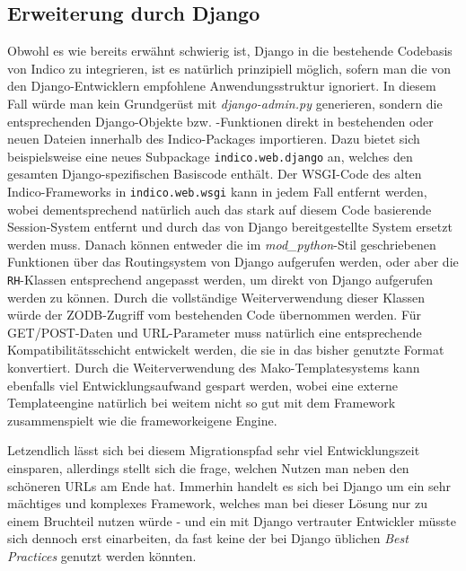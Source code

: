 \subsection{Erweiterung durch Django}
Obwohl es wie bereits erwähnt schwierig ist, Django in die bestehende Codebasis von Indico zu
integrieren, ist es natürlich prinzipiell möglich, sofern man die von den Django-Entwicklern
empfohlene Anwendungsstruktur ignoriert. In diesem Fall würde man kein Grundgerüst mit
\emph{django-admin.py} generieren, sondern die entsprechenden Django-Objekte bzw. -Funktionen direkt
in bestehenden oder neuen Dateien innerhalb des Indico-Packages importieren. Dazu bietet sich
beispielsweise eine neues Subpackage \lstinline{indico.web.django} an, welches den gesamten
Django-spezifischen Basiscode enthält. Der WSGI-Code des alten Indico-Frameworks in
\lstinline{indico.web.wsgi} kann in jedem Fall entfernt werden, wobei dementsprechend natürlich auch
das stark auf diesem Code basierende Session-System entfernt und durch das von Django
bereitgestellte System ersetzt werden muss. Danach können entweder die im \emph{mod\_python}-Stil
geschriebenen Funktionen über das Routingsystem von Django aufgerufen werden, oder aber die
\lstinline{RH}-Klassen entsprechend angepasst werden, um direkt von Django aufgerufen werden zu
können. Durch die vollständige Weiterverwendung dieser Klassen würde der ZODB-Zugriff vom
bestehenden Code übernommen werden. Für GET/POST-Daten und URL-Parameter muss natürlich eine
entsprechende Kompatibilitätsschicht entwickelt werden, die sie in das bisher genutzte Format
konvertiert. Durch die Weiterverwendung des Mako-Templatesystems kann ebenfalls viel
Entwicklungsaufwand gespart werden, wobei eine externe Templateengine natürlich bei weitem nicht so
gut mit dem Framework zusammenspielt wie die frameworkeigene Engine.

Letzendlich lässt sich bei diesem Migrationspfad sehr viel Entwicklungszeit einsparen, allerdings
stellt sich die frage, welchen Nutzen man neben den schöneren URLs am Ende hat. Immerhin handelt es
sich bei Django um ein sehr mächtiges und komplexes Framework, welches man bei dieser Lösung nur zu
einem Bruchteil nutzen würde - und ein mit Django vertrauter Entwickler müsste sich dennoch erst
einarbeiten, da fast keine der bei Django üblichen \emph{Best Practices} genutzt werden könnten.



